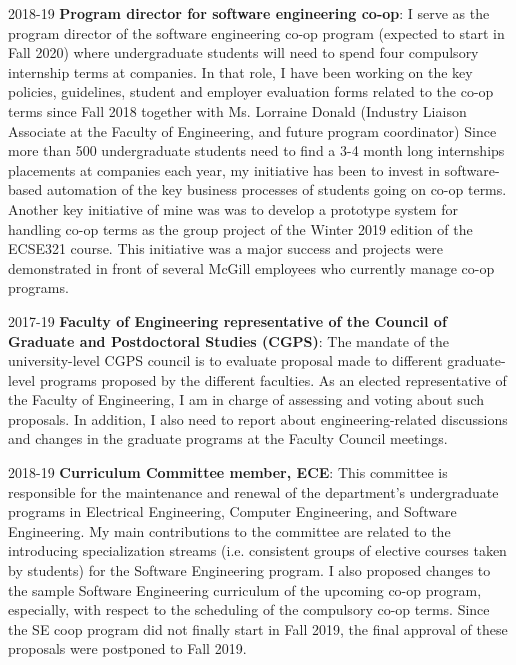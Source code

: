 \begin{yearlist}
\item[2018-19] \textbf{Program director for software engineering co-op}: 
I serve as the program director of the software engineering co-op program (expected to start in Fall 2020) where undergraduate students will need to spend four compulsory internship terms at companies. In that role, I have been working on the key policies, guidelines, student and employer evaluation forms related to the co-op terms since Fall 2018 together with Ms. Lorraine Donald (Industry Liaison Associate at the Faculty of Engineering, and future program coordinator)
Since more than 500 undergraduate students need to find a 3-4 month long internships placements at companies each year, my initiative has been to invest in software-based automation of the key business processes of students going on co-op terms. Another key initiative of mine was was to develop a prototype system for handling co-op terms as the group project of the Winter 2019 edition of the ECSE321 course. This initiative was a major success and projects were demonstrated in front of several McGill employees who currently manage 
co-op programs. 



\item[2017-19] \textbf{Faculty of Engineering representative of the Council of Graduate and Postdoctoral Studies (CGPS)}: The mandate of the university-level CGPS council is to evaluate proposal made to different graduate-level programs proposed by the different faculties. As an elected representative of the Faculty of Engineering, I am in charge of assessing and voting about such proposals. In addition, I also need to report about engineering-related discussions and changes in the graduate programs at the Faculty Council meetings. 
\item[2018-19] \textbf{Curriculum Committee member, ECE}: 
This committee is responsible for the maintenance and renewal of the department’s undergraduate programs in Electrical Engineering, Computer Engineering, and Software Engineering. My main contributions to the committee are related to the introducing specialization streams (i.e. consistent groups of elective courses taken by students) for the Software Engineering program. I also proposed changes to the sample Software Engineering curriculum of the upcoming co-op program, especially, with respect to the scheduling of the compulsory co-op terms. Since the SE coop program did not finally start in Fall 2019, the final approval of these proposals were postponed to Fall 2019.


\end{yearlist}
